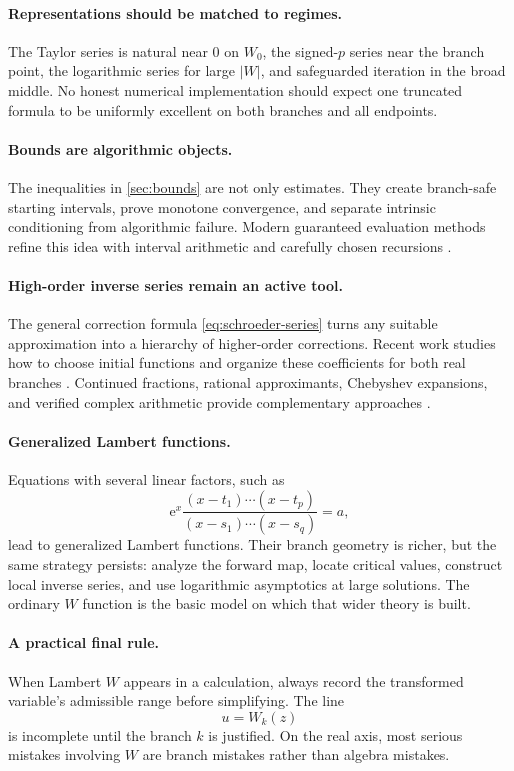 \documentclass[11pt]{article}
\numberwithin{equation}{section}
\theoremstyle{definition}
\theoremstyle{remark}
\newcommand{\e}{\mathrm e}
\begin{document}
\paragraph{Representations should be matched to regimes.}
The Taylor series is natural near $0$ on $W_0$, the signed-$p$ series near the
branch point, the logarithmic series for large $|W|$, and safeguarded
iteration in the broad middle.  No honest numerical implementation should
expect one truncated formula to be uniformly excellent on both branches and
all endpoints.

\paragraph{Bounds are algorithmic objects.}
The inequalities in \cref{sec:bounds} are not only estimates.  They create
branch-safe starting intervals, prove monotone convergence, and separate
intrinsic conditioning from algorithmic failure.  Modern guaranteed
evaluation methods refine this idea with interval arithmetic and carefully
chosen recursions \cite{Loczi2022}.

\paragraph{High-order inverse series remain an active tool.}
The general correction formula \eqref{eq:schroeder-series} turns any suitable
approximation into a hierarchy of higher-order corrections.  Recent work
studies how to choose initial functions and organize these coefficients for
both real branches \cite{Howard2025}.  Continued fractions, rational
approximants, Chebyshev expansions, and verified complex arithmetic provide
complementary approaches \cite{Barry2000,IaconoBoyd2017,Corcino2018}.

\paragraph{Generalized Lambert functions.}
Equations with several linear factors, such as
\[
  \e^x\frac{(x-t_1)\cdots(x-t_p)}{(x-s_1)\cdots(x-s_q)}=a,
\]
lead to generalized Lambert functions.  Their branch geometry is richer, but
the same strategy persists: analyze the forward map, locate critical values,
construct local inverse series, and use logarithmic asymptotics at large
solutions.  The ordinary $W$ function is the basic model on which that wider
theory is built.

\paragraph{A practical final rule.}
When Lambert $W$ appears in a calculation, always record the transformed
variable's admissible range before simplifying.  The line
\[
  u=W_k(z)
\]
is incomplete until the branch $k$ is justified.  On the real axis, most
serious mistakes involving $W$ are branch mistakes rather than algebra
mistakes.
\end{document}
